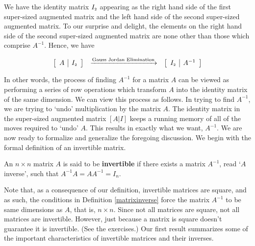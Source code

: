 We have the identity matrix $I_{\mbox{\tiny$2$}}$ appearing as the right hand side of the first super-sized augmented matrix and the left hand side of the second super-sized augmented matrix.  To our surprise and delight, the elements on the right hand side of the second super-sized augmented matrix are none other than those which comprise $A^{-1}$.  Hence, we have

\[ \begin{array}{ccc}

\left[ \begin{array}{c|c} A & I_{\mbox{\tiny$2$}} \end{array} \right]

&
\xrightarrow{\text{Gauss Jordan Elimination}}

&

\left[ \begin{array}{c|c} I_{\mbox{\tiny$2$}} & A^{-1} \end{array} \right] 

\end{array}\]

In other words, the process of finding $A^{-1}$ for a matrix $A$ can be viewed as performing a series of row operations which transform $A$ into the identity matrix of the same dimension.  We can view this process as follows.  In trying to find $A^{-1}$, we are trying to `undo' multiplication by the matrix $A$.  The identity matrix in the  super-sized augmented matrix $[A | I]$ keeps a running memory of all of the moves required to `undo' $A$.  This results in exactly what we want, $A^{-1}$.  We are now ready to formalize and generalize the foregoing discussion.  We begin with the formal definition of an invertible matrix.

\smallskip

\colorbox{ResultColor}{\bbm

\begin{defn}  \label{matrixinverse}  An $n \times n$ matrix $A$ is said to be    \textbf{invertible} if there exists a matrix $A^{-1}$, read `$A$ inverse', such that $A^{-1}A = AA^{-1}=I_{n}$. 
\end{defn}
\ebm}


\smallskip

Note that, as a consequence of our definition, invertible matrices are square, and as such, the conditions in Definition \ref{matrixinverse} force the matrix $A^{-1}$ to be same dimensions as $A$, that is, $n \times n$.  Since not all matrices are square, not all matrices are invertible.  However, just because a matrix is square doesn't guarantee it is invertible.  (See the exercises.)   Our first result summarizes some of the important characteristics of invertible matrices and their inverses.  

